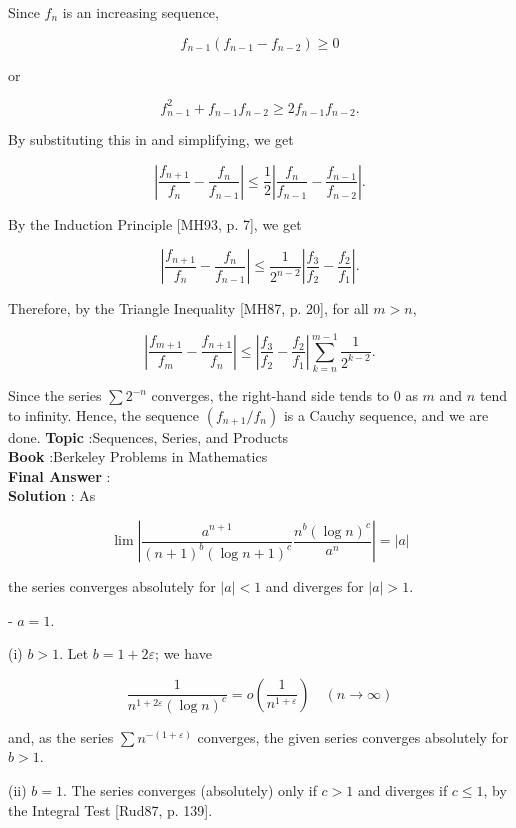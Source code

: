 \documentclass[10pt]{article}
\begin{document}
Since $f_{n}$ is an increasing sequence,

$$
f_{n-1}\left(f_{n-1}-f_{n-2}\right) \geqslant 0
$$

or

$$
f_{n-1}^{2}+f_{n-1} f_{n-2} \geqslant 2 f_{n-1} f_{n-2} .
$$

By substituting this in and simplifying, we get

$$
\left|\frac{f_{n+1}}{f_{n}}-\frac{f_{n}}{f_{n-1}}\right| \leqslant \frac{1}{2}\left|\frac{f_{n}}{f_{n-1}}-\frac{f_{n-1}}{f_{n-2}}\right| .
$$

By the Induction Principle [MH93, p. 7], we get

$$
\left|\frac{f_{n+1}}{f_{n}}-\frac{f_{n}}{f_{n-1}}\right| \leqslant \frac{1}{2^{n-2}}\left|\frac{f_{3}}{f_{2}}-\frac{f_{2}}{f_{1}}\right| .
$$

Therefore, by the Triangle Inequality [MH87, p. 20], for all $m>n$,

$$
\left|\frac{f_{m+1}}{f_{m}}-\frac{f_{n+1}}{f_{n}}\right| \leqslant\left|\frac{f_{3}}{f_{2}}-\frac{f_{2}}{f_{1}}\right| \sum_{k=n}^{m-1} \frac{1}{2^{k-2}} .
$$

Since the series $\sum 2^{-n}$ converges, the right-hand side tends to 0 as $m$ and $n$ tend to infinity. Hence, the sequence $\left(f_{n+1} / f_{n}\right)$ is a Cauchy sequence, and we are done.
\textbf{Topic} :Sequences, Series, and Products \\
\textbf{Book} :Berkeley Problems in Mathematics\\
\textbf{Final Answer} :\\


\textbf{Solution} : As

$$
\lim \left|\frac{a^{n+1}}{(n+1)^{b}(\log n+1)^{c}} \frac{n^{b}(\log n)^{c}}{a^{n}}\right|=|a|
$$

the series converges absolutely for $|a|<1$ and diverges for $|a|>1$.

- $a=1$.

(i) $b>1$. Let $b=1+2 \varepsilon$; we have

$$
\frac{1}{n^{1+2 \varepsilon}(\log n)^{c}}=o\left(\frac{1}{n^{1+\varepsilon}}\right) \quad(n \rightarrow \infty)
$$

and, as the series $\sum n^{-(1+\varepsilon)}$ converges, the given series converges absolutely for $b>1$.

(ii) $b=1$. The series converges (absolutely) only if $c>1$ and diverges if $c \leqslant 1$, by the Integral Test [Rud87, p. 139].
\end{document}
